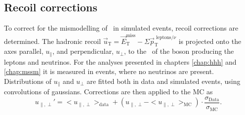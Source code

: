 \subsection{Recoil corrections}
\label{sec:objects_met_recoilcorr}
To correct for the mismodelling of \MET~in simulated events, recoil corrections are determined. 
The hadronic recoil $\vec{u}_{\text{T}} = \vec{E}_{\text{T}}^{\text{miss}} - \Sigma \vec{p}_{\text{T}}^{\text{ leptons}/\nu}$ 
is projected onto the axes parallel, $u_{\parallel}$, and perpendicular, $u_{\perp}$, to the \pT~of the boson producing the leptons
and neutrinos. For the analyses
presented in chapters \ref{chap:hhh} and \ref{chap:mssm} it is measured in \Zmm events, where no neutrinos
are present. Distributions of $u_{\parallel}$ and $u_{\perp}$ are fitted both in data
and simulated events, using convolutions of gaussians. Corrections are then applied to the \ac{MC}
as
\begin{equation}\label{eqn:met_recoilcorr}
u_{\parallel,\perp}' = <u_{\parallel,\perp}>_{\text{data}} + (u_{\parallel,\perp} - <u_{\parallel,\perp}>_{\text{MC}}) \cdot \frac{\sigma_{\text{Data}}}{\sigma_{\text{MC}}}.
\end{equation}

